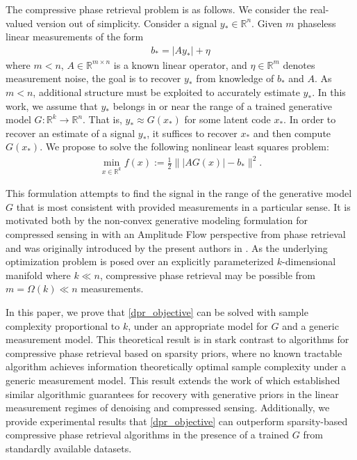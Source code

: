 \documentclass[11pt]{article}
\newcommand{\R}{\mathbb{R}}
\newcommand{\G}{G}
\theoremstyle{remark}
\begin{document}
The compressive phase retrieval problem is as follows.  We consider the real-valued version out of simplicity.  Consider a signal $y_* \in \R^n$.  Given $m$ phaseless linear measurements of the form 
\begin{align}
b_* = |Ay_*| + \eta \label{eqn:measurements-with-noise}
\end{align} where $m<n$, $A \in \R^{m \times n}$ is a known linear operator, and $\eta \in \R^m$ denotes measurement noise, the goal is to recover $y_*$ from knowledge of $b_*$ and $A$.  As $m<n$, additional structure must be exploited to accurately estimate $y_*$.  In this work, we assume that $y_*$ belongs in or near the range of a trained generative model $\G : \R^k \rightarrow \R^{n}$.  That is, $y_* \approx \G(x_*)$ for some latent code $x_*$.  In order to recover an estimate of a signal $y_*$, it suffices to recover $x_*$ and then compute $\G(x_*)$. We propose to solve the following nonlinear least squares problem:\begin{align}
\min_{x \in \R^k} f(x) := \frac{1}{2} \Big\| |A\G(x)| - b_* \Big\|^2 \label{dpr_objective}.
\end{align} 

This formulation attempts to find the signal in the range of the generative model $\G$ that is most consistent with provided measurements in a particular sense.  It is motivated both by the non-convex generative modeling formulation for compressed sensing in \cite{Price2017} with an  Amplitude Flow \cite{AmpFlow} perspective from phase retrieval and was originally introduced by the present authors in \cite{HLV18}. As the underlying optimization problem is posed over an explicitly parameterized $k$-dimensional manifold where $k \ll n$, compressive phase retrieval may be possible from $m = \Omega(k) \ll n$ measurements. %

In this paper, we prove that \eqref{dpr_objective} can be solved with sample complexity proportional to $k$, under an appropriate model for $\G$ and a generic measurement model.  This theoretical result is in stark contrast to algorithms for compressive phase retrieval based on sparsity priors, where no known tractable algorithm achieves information theoretically optimal sample complexity under a generic measurement model. This result extends the work of \cite{Heckeletal2018, Huangetal2018} which established similar algorithmic guarantees for recovery with generative priors in the linear measurement regimes of denoising and compressed sensing.
 Additionally, we provide experimental results that \eqref{dpr_objective} can outperform sparsity-based compressive phase retrieval algorithms in the presence of a trained $\G$ from standardly available datasets.  
\end{document}
